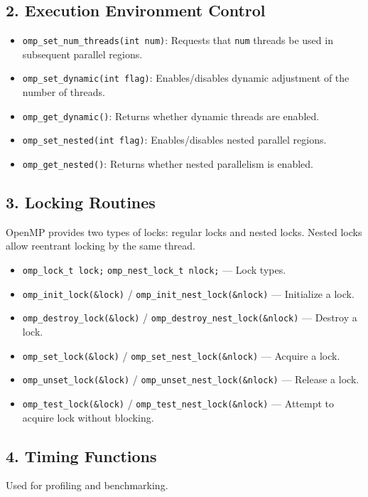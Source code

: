 \documentclass[12pt]{book}
\begin{document}
\subsection{2. Execution Environment Control}
\begin{itemize}
    \item \texttt{omp\_set\_num\_threads(int num)}: Requests that \texttt{num} threads be used in subsequent parallel regions.
    \item \texttt{omp\_set\_dynamic(int flag)}: Enables/disables dynamic adjustment of the number of threads.
    \item \texttt{omp\_get\_dynamic()}: Returns whether dynamic threads are enabled.
    \item \texttt{omp\_set\_nested(int flag)}: Enables/disables nested parallel regions.
    \item \texttt{omp\_get\_nested()}: Returns whether nested parallelism is enabled.
\end{itemize}

\subsection{3. Locking Routines}
OpenMP provides two types of locks: regular locks and nested locks. Nested locks allow reentrant locking by the same thread.

\begin{itemize}
    \item \texttt{omp\_lock\_t lock;} \quad \texttt{omp\_nest\_lock\_t nlock;} — Lock types.
    \item \texttt{omp\_init\_lock(\&lock)} / \texttt{omp\_init\_nest\_lock(\&nlock)} — Initialize a lock.
    \item \texttt{omp\_destroy\_lock(\&lock)} / \texttt{omp\_destroy\_nest\_lock(\&nlock)} — Destroy a lock.
    \item \texttt{omp\_set\_lock(\&lock)} / \texttt{omp\_set\_nest\_lock(\&nlock)} — Acquire a lock.
    \item \texttt{omp\_unset\_lock(\&lock)} / \texttt{omp\_unset\_nest\_lock(\&nlock)} — Release a lock.
    \item \texttt{omp\_test\_lock(\&lock)} / \texttt{omp\_test\_nest\_lock(\&nlock)} — Attempt to acquire lock without blocking.
\end{itemize}

\subsection{4. Timing Functions}
Used for profiling and benchmarking.
\end{document}
